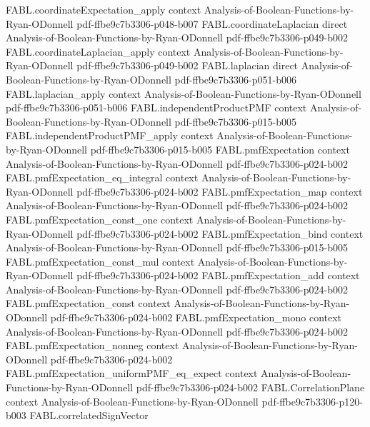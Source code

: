 \begin{theorem}
\proofstep
  {FABL.coordinateExpectation_apply}
  {context}
  {Analysis-of-Boolean-Functions-by-Ryan-ODonnell}
  {pdf-ffbe9c7b3306-p048-b007}
\proofstep
  {FABL.coordinateLaplacian}
  {direct}
  {Analysis-of-Boolean-Functions-by-Ryan-ODonnell}
  {pdf-ffbe9c7b3306-p049-b002}
\proofstep
  {FABL.coordinateLaplacian_apply}
  {context}
  {Analysis-of-Boolean-Functions-by-Ryan-ODonnell}
  {pdf-ffbe9c7b3306-p049-b002}
\proofstep
  {FABL.laplacian}
  {direct}
  {Analysis-of-Boolean-Functions-by-Ryan-ODonnell}
  {pdf-ffbe9c7b3306-p051-b006}
\proofstep
  {FABL.laplacian_apply}
  {context}
  {Analysis-of-Boolean-Functions-by-Ryan-ODonnell}
  {pdf-ffbe9c7b3306-p051-b006}
\proofstep
  {FABL.independentProductPMF}
  {context}
  {Analysis-of-Boolean-Functions-by-Ryan-ODonnell}
  {pdf-ffbe9c7b3306-p015-b005}
\proofstep
  {FABL.independentProductPMF_apply}
  {context}
  {Analysis-of-Boolean-Functions-by-Ryan-ODonnell}
  {pdf-ffbe9c7b3306-p015-b005}
\proofstep
  {FABL.pmfExpectation}
  {context}
  {Analysis-of-Boolean-Functions-by-Ryan-ODonnell}
  {pdf-ffbe9c7b3306-p024-b002}
\proofstep
  {FABL.pmfExpectation_eq_integral}
  {context}
  {Analysis-of-Boolean-Functions-by-Ryan-ODonnell}
  {pdf-ffbe9c7b3306-p024-b002}
\proofstep
  {FABL.pmfExpectation_map}
  {context}
  {Analysis-of-Boolean-Functions-by-Ryan-ODonnell}
  {pdf-ffbe9c7b3306-p024-b002}
\proofstep
  {FABL.pmfExpectation_const_one}
  {context}
  {Analysis-of-Boolean-Functions-by-Ryan-ODonnell}
  {pdf-ffbe9c7b3306-p024-b002}
\proofstep
  {FABL.pmfExpectation_bind}
  {context}
  {Analysis-of-Boolean-Functions-by-Ryan-ODonnell}
  {pdf-ffbe9c7b3306-p015-b005}
\proofstep
  {FABL.pmfExpectation_const_mul}
  {context}
  {Analysis-of-Boolean-Functions-by-Ryan-ODonnell}
  {pdf-ffbe9c7b3306-p024-b002}
\proofstep
  {FABL.pmfExpectation_add}
  {context}
  {Analysis-of-Boolean-Functions-by-Ryan-ODonnell}
  {pdf-ffbe9c7b3306-p024-b002}
\proofstep
  {FABL.pmfExpectation_const}
  {context}
  {Analysis-of-Boolean-Functions-by-Ryan-ODonnell}
  {pdf-ffbe9c7b3306-p024-b002}
\proofstep
  {FABL.pmfExpectation_mono}
  {context}
  {Analysis-of-Boolean-Functions-by-Ryan-ODonnell}
  {pdf-ffbe9c7b3306-p024-b002}
\proofstep
  {FABL.pmfExpectation_nonneg}
  {context}
  {Analysis-of-Boolean-Functions-by-Ryan-ODonnell}
  {pdf-ffbe9c7b3306-p024-b002}
\proofstep
  {FABL.pmfExpectation_uniformPMF_eq_expect}
  {context}
  {Analysis-of-Boolean-Functions-by-Ryan-ODonnell}
  {pdf-ffbe9c7b3306-p024-b002}
\proofstep
  {FABL.CorrelationPlane}
  {context}
  {Analysis-of-Boolean-Functions-by-Ryan-ODonnell}
  {pdf-ffbe9c7b3306-p120-b003}
\proofstep
  {FABL.correlatedSignVector}

\end{theorem}
